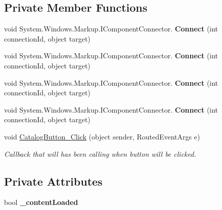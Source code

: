 \subsection*{Private Member Functions}
\begin{DoxyCompactItemize}
\item 
\mbox{\label{class_wpf_handler_1_1_u_i_1_1_controls_1_1_flat_button_a8dbfddaea8859d6d10ddc916cd6ce094}} 
void System.\+Windows.\+Markup.\+I\+Component\+Connector. {\bfseries Connect} (int connection\+Id, object target)
\item 
\mbox{\label{class_wpf_handler_1_1_u_i_1_1_controls_1_1_flat_button_a8dbfddaea8859d6d10ddc916cd6ce094}} 
void System.\+Windows.\+Markup.\+I\+Component\+Connector. {\bfseries Connect} (int connection\+Id, object target)
\item 
\mbox{\label{class_wpf_handler_1_1_u_i_1_1_controls_1_1_flat_button_a8dbfddaea8859d6d10ddc916cd6ce094}} 
void System.\+Windows.\+Markup.\+I\+Component\+Connector. {\bfseries Connect} (int connection\+Id, object target)
\item 
\mbox{\label{class_wpf_handler_1_1_u_i_1_1_controls_1_1_flat_button_a8dbfddaea8859d6d10ddc916cd6ce094}} 
void System.\+Windows.\+Markup.\+I\+Component\+Connector. {\bfseries Connect} (int connection\+Id, object target)
\item 
void \mbox{\hyperlink{class_wpf_handler_1_1_u_i_1_1_controls_1_1_flat_button_aa391448d8f6b7a7c00cb43c6096a9d6d}{Catalog\+Button\+\_\+\+Click}} (object sender, Routed\+Event\+Args e)
\begin{DoxyCompactList}\small\item\em Callback that will has been calling when button will be clicked. \end{DoxyCompactList}\end{DoxyCompactItemize}
\subsection*{Private Attributes}
\begin{DoxyCompactItemize}
\item 
\mbox{\label{class_wpf_handler_1_1_u_i_1_1_controls_1_1_flat_button_a894cd257cfad5ffdf7b4208cb022d41d}} 
bool {\bfseries \+\_\+content\+Loaded}
\end{DoxyCompactItemize}


